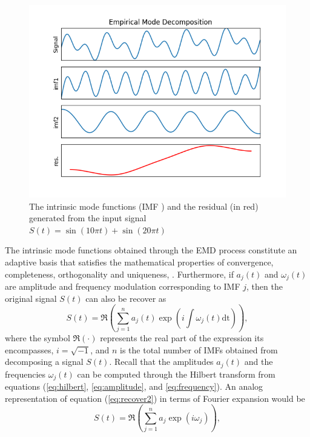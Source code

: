 \documentclass[../Main/thesis.tex]{subfiles}
\begin{document}
\begin{figure}[H] %
   \centering
   \includegraphics[width=6in]{../fig/imfEMD.png} 
   \caption{The intrinsic mode functions (IMF ) and the residual (in red) generated from the input signal $S(t) = \sin(10 \pi t) + \sin(20 \pi t) $}
   \label{fig:emd3}
\end{figure}
\justify
The intrinsic mode functions obtained through the EMD process constitute an adaptive basis that satisfies the mathematical properties of convergence, completeness, orthogonality and uniqueness, \cite{huang98}. Furthermore, if $a_{j}(t)$ and $\omega_{j}(t)$ are amplitude and frequency modulation corresponding to IMF $j$, then the original signal $S(t)$ can also be recover as 
\begin{equation}\label{eq:recover2}
S(t) = \Re{\left( \sum_{j=1}^{n}a_{j}(t)\exp\left(i\int\omega_{j}(t)\mathrm{dt}\right)  \right)},
\end{equation} 
where the symbol $\Re(\cdot)$ represents the real part of the expression its encompasses, $i=\sqrt{-1}$, and $n$ is the total number of IMFs obtained from decomposing a signal $S(t)$. Recall that the amplitudes $a_{j}(t)$ and the frequencies $\omega_{j}(t)$ can be computed through the Hilbert transform from equations (\ref{eq:hilbert}, \ref{eq:amplitude}, and \ref{eq:frequency}). An analog representation of equation (\ref{eq:recover2}) in terms of Fourier expansion would be 
\begin{equation}\label{eq:recoverFourier}
S(t) = \Re{\left( \sum_{j=1}^{n}a_{j}\exp\left(i\omega_{j}\right)  \right)},
\end{equation} 
\end{document}
